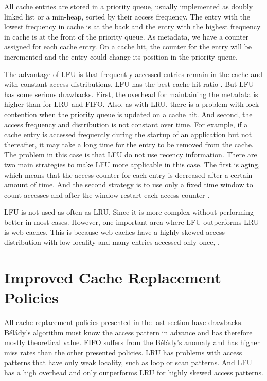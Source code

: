 \documentclass[
	12pt,
	a4paper,
	abstract,
	bibliography=totoc,
	chapterprefix,
	headings=openright,
	numbers=endperiod,
	parskip=half,
	twoside,
]{scrreprt}
\begin{document}
All cache entries are stored in a priority queue, usually implemented as 
doubly linked list or a min-heap, sorted by their access frequency.
The entry with the lowest frequency in cache is at the back and the entry with the highest frequency in cache 
is at the front of the priority queue.
As metadata, we have a counter assigned for each cache entry.
On a cache hit, the counter for the entry will be incremented and the entry could change its position in the priority queue.

The advantage of LFU is that frequently accessed entries remain in the cache and with constant
access distributions, LFU has the best cache hit ratio \cite{einziger2017tinylfu}.
But LFU has some  serious drawbacks.
First, the overhead for maintaining the metadata is higher than for LRU and FIFO.
Also, as with LRU, there is a problem with lock contention when the priority queue is updated on a cache hit.
And second, the access frequency and distribution is not constant over time.
For example, if a cache entry is accessed frequently during the startup of an application but not thereafter, 
it may take a long time for the 
entry to be removed from the cache.
The problem in this case is that LFU do not use recency information.
There are two main strategies to make LFU more applicable in this case.
The first is aging, which means that the access counter for each entry is decreased after  a certain amount of time.
And the second strategy is to use only a fixed time window to count accesses and after the window restart 
each access counter \cite{karakostas2000practical}.

LFU is not used as often as LRU.
Since it is more complex without performing better in most cases.
However, one important area where LFU outperforms LRU is web caches.
This is because web caches have a highly skewed access distribution with low locality and  
many entries accessed only once, \cite{mahanti2000traffic}.

\section{Improved Cache Replacement Policies}
\label{sec:improved cache replacement policies}

All cache replacement policies presented in the last section have drawbacks.
Bélády's algorithm must know the access pattern in advance and has therefore mostly theoretical value.
FIFO suffers from the Bélády's anomaly and has higher miss rates than the other presented policies.
LRU has problems with access patterns that have only weak locality, such as loop or scan patterns.
And LFU has a high overhead and only outperforms LRU for highly skewed access patterns. 
\end{document}
